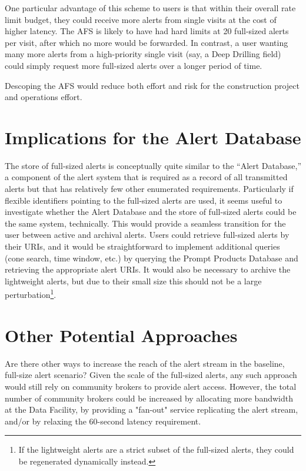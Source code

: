 \documentclass[DM,authoryear,toc]{lsstdoc}
\begin{document}

One particular advantage of this scheme to users is that within their overall rate limit budget, they could receive more alerts from single visits at the cost of higher latency.
The AFS is likely to have had hard limits at 20 full-sized alerts per visit, after which no more would be forwarded.
In contrast, a user wanting many more alerts from a high-priority single visit (say, a Deep Drilling field) could simply request more full-sized alerts over a longer period of time.

Descoping the AFS would reduce both effort and risk for the construction project and operations effort.

\section{Implications for the Alert Database} \label{sec:alertdb}

The store of full-sized alerts is conceptually quite similar to the ``Alert Database,'' a component of the alert system that is required as a record of all transmitted alerts but that has relatively few other enumerated requirements.
Particularly if flexible identifiers pointing to the full-sized alerts are used, it seems useful to investigate whether the Alert Database and the store of full-sized alerts could be the same system, technically.
This would provide a seamless transition for the user between active and archival alerts.
Users could retrieve full-sized alerts by their URIs, and it would be straightforward to implement additional queries (cone search, time window, etc.) by querying the Prompt Products Database and retrieving the appropriate alert URIs.
It would also be necessary to archive the lightweight alerts, but due to their small size this should not be a large perturbation\footnote{If the lightweight alerts are a strict subset of the full-sized alerts, they could be regenerated dynamically instead.}.

\section{Other Potential Approaches} \label{sec:alerternatives}

Are there other ways to increase the reach of the alert stream in the baseline, full-size alert scenario?
Given the scale of the full-sized alerts, any such approach would still rely on community brokers to provide alert access.
However, the total number of community brokers could be increased by allocating more bandwidth at the Data Facility, by providing a "fan-out" service replicating the alert stream, and/or by relaxing the 60-second latency requirement.
\end{document}
